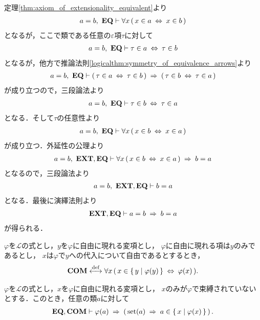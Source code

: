 	\begin{prf}
		定理\ref{thm:axiom_of_extensionality_equivalent}より
		\begin{align}
			a=b,\ \mbox{{\bf EQ}} \vdash \forall x\, (\, x \in a  \hspace{0.25em}\Leftrightarrow\hspace{0.25em} x \in b\, )
		\end{align}
		となるが，ここで類である任意の$\varepsilon$項$\tau$に対して
		\begin{align}
			a=b,\ \mbox{{\bf EQ}} \vdash \tau \in a \hspace{0.25em}\Leftrightarrow\hspace{0.25em} \tau \in b
		\end{align}
		となるが，他方で推論法則\ref{logicalthm:symmetry_of_equivalence_arrows}より
		\begin{align}
			a=b,\ \mbox{{\bf EQ}} \vdash (\, \tau \in a \hspace{0.25em}\Leftrightarrow\hspace{0.25em} \tau \in b\, )
				\hspace{0.25em}\Rightarrow\hspace{0.25em} (\, \tau \in b \hspace{0.25em}\Leftrightarrow\hspace{0.25em} \tau \in a\, )
		\end{align}
		が成り立つので，三段論法より
		\begin{align}
			a=b,\ \mbox{{\bf EQ}} \vdash \tau \in b \hspace{0.25em}\Leftrightarrow\hspace{0.25em} \tau \in a
		\end{align}
		となる．そして$\tau$の任意性より
		\begin{align}
			a=b,\ \mbox{{\bf EQ}} \vdash \forall x\, (\, x \in b  \hspace{0.25em}\Leftrightarrow\hspace{0.25em} x \in a\, )
		\end{align}
		が成り立つ．外延性の公理より
		\begin{align}
			a=b,\ \mbox{{\bf EXT}},\mbox{{\bf EQ}} \vdash \forall x\, (\, x \in b  \hspace{0.25em}\Leftrightarrow\hspace{0.25em} x \in a\, )
			\hspace{0.25em}\Rightarrow\hspace{0.25em} b = a
		\end{align}
		となるので，三段論法より
		\begin{align}
			a=b,\ \mbox{{\bf EXT}},\mbox{{\bf EQ}} \vdash b = a
		\end{align}
		となる．最後に演繹法則より
		\begin{align}
			\mbox{{\bf EXT}},\mbox{{\bf EQ}} \vdash a = b \hspace{0.25em}\Rightarrow\hspace{0.25em} b = a
		\end{align}
		が得られる．
		\QED
	\end{prf}
	
	\begin{screen}
		\begin{axm}[内包性公理] 
			$\varphi$を$\mathcal{L}$の式とし，$y$を$\varphi$に自由に現れる変項とし，
			$\varphi$に自由に現れる項は$y$のみであるとし，
			$x$は$\varphi$で$y$への代入について自由であるとするとき，
			\begin{align}
				\mbox{\bf COM} \overset{\mathrm{def}}{\longleftrightarrow} \forall x\, (\, x \in \left\{\, y \mid \varphi(y)\, \right\} \hspace{0.25em}\Leftrightarrow\hspace{0.25em} \varphi(x)\, ).
			\end{align}
		\end{axm}
	\end{screen}
	
	\begin{screen}
		\begin{thm}[条件を満たす集合は要素である]\label{thm:satisfactory_set_is_an_element}
			$\varphi$を$\mathcal{L}$の式とし，$x$を$\varphi$に自由に現れる変項とし，
			$x$のみが$\varphi$で束縛されていないとする．このとき，任意の類$a$に対して
			\begin{align}
				\mbox{{\bf EQ}},\mbox{\bf COM} \vdash \varphi(a) \hspace{0.25em}\Rightarrow\hspace{0.25em} 
				\left(\, \operatorname*{set} (a) \hspace{0.25em}\Rightarrow\hspace{0.25em} a \in \left\{\, x \mid \varphi(x)\, \right\}\, \right).
			\end{align}
		\end{thm}
	\end{screen}
	
